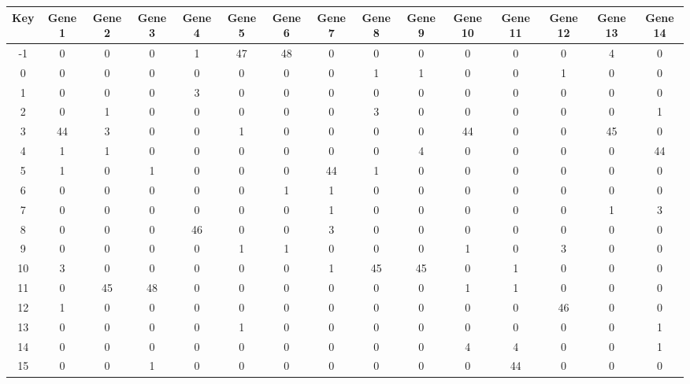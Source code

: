 \begin{tabular}{|c|c|c|c|c|c|c|c|c|c|c|c|c|c|c|}
\hline
Key & Gene 1 & Gene 2 & Gene 3 & Gene 4 & Gene 5 & Gene 6 & Gene 7 & Gene 8 & Gene 9 & Gene 10 & Gene 11 & Gene 12 & Gene 13 & Gene 14 \\
\hline
-1 & 0 & 0 & 0 & 1 & 47 & 48 & 0 & 0 & 0 & 0 & 0 & 0 & 4 & 0 \\
0 & 0 & 0 & 0 & 0 & 0 & 0 & 0 & 1 & 1 & 0 & 0 & 1 & 0 & 0 \\
1 & 0 & 0 & 0 & 3 & 0 & 0 & 0 & 0 & 0 & 0 & 0 & 0 & 0 & 0 \\
2 & 0 & 1 & 0 & 0 & 0 & 0 & 0 & 3 & 0 & 0 & 0 & 0 & 0 & 1 \\
3 & 44 & 3 & 0 & 0 & 1 & 0 & 0 & 0 & 0 & 44 & 0 & 0 & 45 & 0 \\
4 & 1 & 1 & 0 & 0 & 0 & 0 & 0 & 0 & 4 & 0 & 0 & 0 & 0 & 44 \\
5 & 1 & 0 & 1 & 0 & 0 & 0 & 44 & 1 & 0 & 0 & 0 & 0 & 0 & 0 \\
6 & 0 & 0 & 0 & 0 & 0 & 1 & 1 & 0 & 0 & 0 & 0 & 0 & 0 & 0 \\
7 & 0 & 0 & 0 & 0 & 0 & 0 & 1 & 0 & 0 & 0 & 0 & 0 & 1 & 3 \\
8 & 0 & 0 & 0 & 46 & 0 & 0 & 3 & 0 & 0 & 0 & 0 & 0 & 0 & 0 \\
9 & 0 & 0 & 0 & 0 & 1 & 1 & 0 & 0 & 0 & 1 & 0 & 3 & 0 & 0 \\
10 & 3 & 0 & 0 & 0 & 0 & 0 & 1 & 45 & 45 & 0 & 1 & 0 & 0 & 0 \\
11 & 0 & 45 & 48 & 0 & 0 & 0 & 0 & 0 & 0 & 1 & 1 & 0 & 0 & 0 \\
12 & 1 & 0 & 0 & 0 & 0 & 0 & 0 & 0 & 0 & 0 & 0 & 46 & 0 & 0 \\
13 & 0 & 0 & 0 & 0 & 1 & 0 & 0 & 0 & 0 & 0 & 0 & 0 & 0 & 1 \\
14 & 0 & 0 & 0 & 0 & 0 & 0 & 0 & 0 & 0 & 4 & 4 & 0 & 0 & 1 \\
15 & 0 & 0 & 1 & 0 & 0 & 0 & 0 & 0 & 0 & 0 & 44 & 0 & 0 & 0 \\
\hline
\end{tabular}